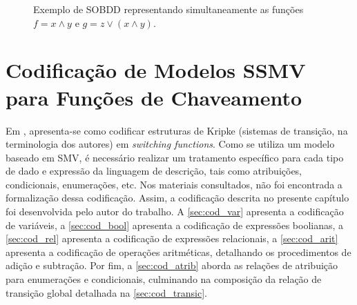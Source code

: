 \documentclass[cic,tc]{infufrgs}
\begin{document}
	\begin{figure}[htbp]
		\centering
		\caption{Exemplo de SOBDD representando simultaneamente as funções $f = x \land y$ e $g = z \lor (x \land y)$.}
		\label{fig:sobdd_exemplo}
	\end{figure}
	
	\chapter{Codificação de Modelos SSMV para Funções de Chaveamento}
	\label{ch:code}
	
	Em , apresenta-se como codificar estruturas de Kripke (sistemas de transição, na terminologia dos autores) em \textit{switching functions}. 
	Como se utiliza um modelo baseado em SMV, é necessário realizar um tratamento específico para cada tipo de dado e expressão da linguagem de descrição, tais como atribuições, condicionais, enumerações, etc.
	Nos materiais consultados, não foi encontrada a formalização dessa codificação.
	Assim, a codificação descrita no presente capítulo foi desenvolvida pelo autor do trabalho. 
	A \autoref{sec:cod_var} apresenta a codificação de variáveis, a \autoref{sec:cod_bool} apresenta a codificação de expressões boolianas, a \autoref{sec:cod_rel} apresenta a codificação de expressões relacionais, a \autoref{sec:cod_arit} apresenta a codificação de operações aritméticas, detalhando os procedimentos de adição e subtração. Por fim, a \autoref{sec:cod_atrib} aborda as relações de atribuição para enumerações e condicionais, culminando na composição da relação de transição global detalhada na \autoref{sec:cod_transic}.
	
\end{document}
